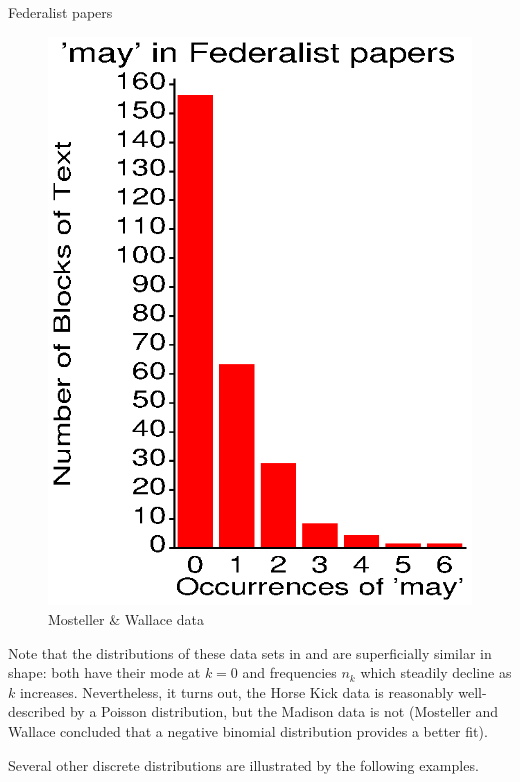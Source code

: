 \begin{Example}[madison1]{Federalist papers}
\begin{figure}[htb]
\begin{minipage}[b]{.5\linewidth}
  \includegraphics[width=.9\linewidth,clip]{ch2/fig/poischart2.eps}
  \caption{Mosteller \& Wallace data}\label{fig:poischart2}
 \end{minipage}
\end{figure}

Note that the distributions of these data sets in 
and  are superficially similar in shape:
both have their mode at $k=0$ and frequencies $n_k$ which steadily
decline as $k$ increases.
Nevertheless, it turns out, the Horse Kick data is reasonably well-described by
a Poisson distribution, but the Madison data is not (Mosteller
and Wallace concluded that a negative binomial distribution provides
a better fit).
\end{Example}

Several other discrete distributions are illustrated by the
following examples.

